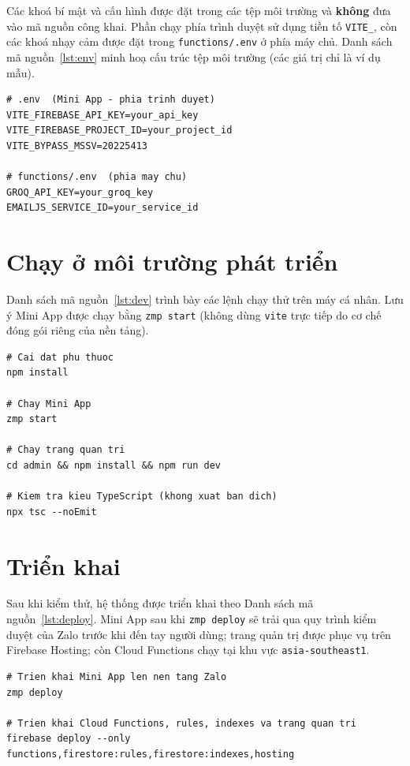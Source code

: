 \documentclass[../main.tex]{subfiles}
\begin{document}
Các khoá bí mật và cấu hình được đặt trong các tệp môi trường và \textbf{không} đưa vào mã
nguồn công khai. Phần chạy phía trình duyệt sử dụng tiền tố \texttt{VITE\_}, còn các khoá nhạy
cảm được đặt trong \texttt{functions/.env} ở phía máy chủ. Danh sách mã nguồn~\ref{lst:env} minh hoạ cấu
trúc tệp môi trường (các giá trị chỉ là ví dụ mẫu).

\begin{lstlisting}[caption={Cấu trúc tệp môi trường (giá trị mẫu)},captionpos=b,label=lst:env]
# .env  (Mini App - phia trinh duyet)
VITE_FIREBASE_API_KEY=your_api_key
VITE_FIREBASE_PROJECT_ID=your_project_id
VITE_BYPASS_MSSV=20225413

# functions/.env  (phia may chu)
GROQ_API_KEY=your_groq_key
EMAILJS_SERVICE_ID=your_service_id
\end{lstlisting}

\section{Chạy ở môi trường phát triển}

Danh sách mã nguồn~\ref{lst:dev} trình bày các lệnh chạy thử trên máy cá nhân. Lưu ý Mini App được chạy
bằng \texttt{zmp start} (không dùng \texttt{vite} trực tiếp do cơ chế đóng gói riêng của
nền tảng).

\begin{lstlisting}[caption={Lệnh chạy môi trường phát triển},captionpos=b,label=lst:dev]
# Cai dat phu thuoc
npm install

# Chay Mini App
zmp start

# Chay trang quan tri
cd admin && npm install && npm run dev

# Kiem tra kieu TypeScript (khong xuat ban dich)
npx tsc --noEmit
\end{lstlisting}

\section{Triển khai}

Sau khi kiểm thử, hệ thống được triển khai theo Danh sách mã nguồn~\ref{lst:deploy}. Mini App sau khi
\texttt{zmp deploy} sẽ trải qua quy trình kiểm duyệt của Zalo trước khi đến tay người dùng;
trang quản trị được phục vụ trên Firebase Hosting; còn Cloud Functions chạy tại khu vực
\texttt{asia-southeast1}.

\begin{lstlisting}[caption={Lệnh triển khai},captionpos=b,label=lst:deploy]
# Trien khai Mini App len nen tang Zalo
zmp deploy

# Trien khai Cloud Functions, rules, indexes va trang quan tri
firebase deploy --only functions,firestore:rules,firestore:indexes,hosting
\end{lstlisting}
\end{document}
